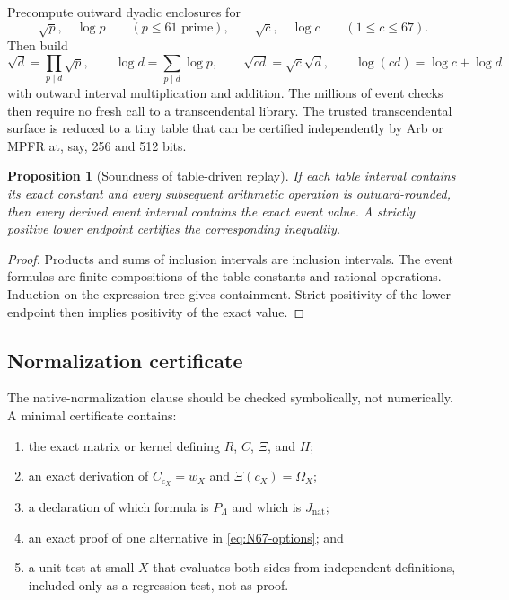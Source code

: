 \documentclass[11pt]{article}
\newtheorem{proposition}[theorem]{Proposition}
\theoremstyle{definition}
\theoremstyle{remark}
\newcommand{\1}{\mathbf 1}
\newcommand{\Nat}{\mathrm{nat}}
\begin{document}
Precompute outward dyadic enclosures for
\[
\sqrt p,\quad \log p\qquad(p\le61\text{ prime}),
\qquad
\sqrt c,\quad\log c\qquad(1\le c\le67).
\]
Then build
\[
\sqrt d=\prod_{p\mid d}\sqrt p,
\qquad
\log d=\sum_{p\mid d}\log p,
\qquad
\sqrt{cd}=\sqrt c\sqrt d,
\qquad
\log(cd)=\log c+\log d
\]
with outward interval multiplication and addition.  The millions of event checks then require no fresh call to a transcendental library.  The trusted transcendental surface is reduced to a tiny table that can be certified independently by Arb or MPFR at, say, 256 and 512 bits.

\begin{proposition}[Soundness of table-driven replay]\label{prop:table-sound}
If each table interval contains its exact constant and every subsequent arithmetic operation is outward-rounded, then every derived event interval contains the exact event value.  A strictly positive lower endpoint certifies the corresponding inequality.
\end{proposition}

\begin{proof}
Products and sums of inclusion intervals are inclusion intervals.  The event formulas are finite compositions of the table constants and rational operations.  Induction on the expression tree gives containment.  Strict positivity of the lower endpoint then implies positivity of the exact value.
\end{proof}

\subsection{Normalization certificate}

The native-normalization clause should be checked symbolically, not numerically.  A minimal certificate contains:
\begin{enumerate}
\item the exact matrix or kernel defining \(R\), \(C\), \(\Xi\), and \(H\);
\item an exact derivation of \(C_{c_X}=w_X\) and \(\Xi(c_X)=\Omega_X\);
\item a declaration of which formula is \(P_\Lambda\) and which is \(J_{\Nat}\);
\item an exact proof of one alternative in \eqref{eq:N67-options}; and
\item a unit test at small \(X\) that evaluates both sides from independent definitions, included only as a regression test, not as proof.
\end{enumerate}
\end{document}
